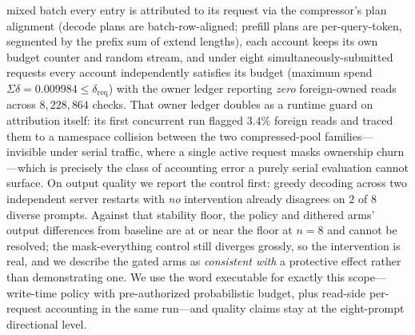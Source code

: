 \documentclass[11pt]{article}
\begin{document}
mixed batch every entry is attributed to its request via the compressor's
plan alignment (decode plans are batch-row-aligned; prefill plans are
per-query-token, segmented by the prefix sum of extend lengths), each account
keeps its own budget counter and random stream, and under eight
simultaneously-submitted requests every account independently satisfies its
budget (maximum spend $\Sigma\delta = 0.009984 \le \delta_{\mathrm{req}}$)
with the owner ledger reporting
\emph{zero} foreign-owned reads across $8{,}228{,}864$ checks. That owner
ledger doubles as a runtime guard on attribution itself: its first concurrent
run flagged $3.4\%$ foreign reads and traced them to a namespace collision
between the two compressed-pool families---invisible under serial traffic,
where a single active request masks ownership churn---which is precisely the
class of accounting error a purely serial evaluation cannot surface. On output quality we report the
control first: greedy decoding across two independent server restarts with
\emph{no} intervention already disagrees on $2$ of $8$ diverse prompts.
Against that stability floor, the policy and dithered arms' output differences
from baseline are at or near the floor at $n{=}8$ and cannot be resolved; the
mask-everything control still diverges grossly, so the intervention is real, and
we describe the gated arms as \emph{consistent with} a protective effect rather
than demonstrating one. We use the word executable for exactly this scope---
write-time policy with pre-authorized probabilistic budget, plus read-side
per-request accounting in the same run---and quality claims stay at the
eight-prompt directional level.
\end{document}
